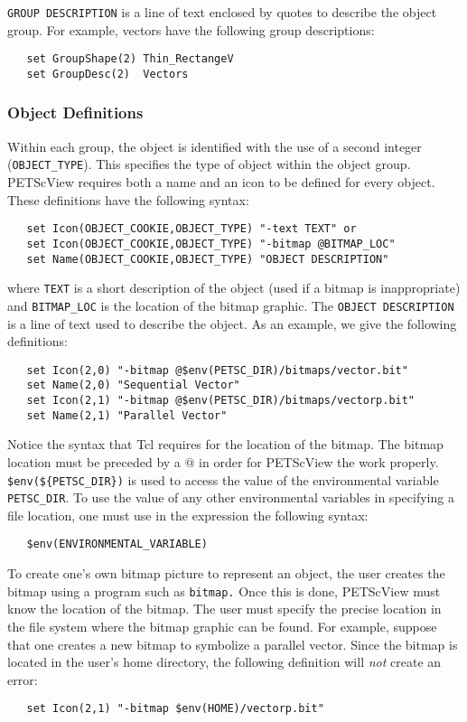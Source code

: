 {\tt GROUP DESCRIPTION} is a line of text enclosed by quotes to describe the object group.  For example, vectors have the following group descriptions:
\begin{verbatim}
   set GroupShape(2) Thin_RectangeV 
   set GroupDesc(2)  Vectors
\end{verbatim}

\subsubsection{Object Definitions}

Within each group, the object is identified with the use of a second integer ({\tt OBJECT\_TYPE}).  This specifies the type of object within the object group.  PETScView requires both a name and an icon to be defined for every object.  These definitions have the following syntax:
\begin{verbatim}
   set Icon(OBJECT_COOKIE,OBJECT_TYPE) "-text TEXT" or 
   set Icon(OBJECT_COOKIE,OBJECT_TYPE) "-bitmap @BITMAP_LOC"
   set Name(OBJECT_COOKIE,OBJECT_TYPE) "OBJECT DESCRIPTION"
\end{verbatim}
where {\tt TEXT} is a short description of the object (used if a bitmap is inappropriate) and {\tt BITMAP\_LOC} is the location of the bitmap graphic.  The {\tt OBJECT DESCRIPTION} is a line of text used to describe the object.  As an example, we give the following definitions:
\begin{verbatim}
   set Icon(2,0) "-bitmap @$env(PETSC_DIR)/bitmaps/vector.bit" 
   set Name(2,0) "Sequential Vector" 
   set Icon(2,1) "-bitmap @$env(PETSC_DIR)/bitmaps/vectorp.bit" 
   set Name(2,1) "Parallel Vector"
\end{verbatim}
Notice the syntax that Tcl requires for the location of the bitmap.
The bitmap location must be preceded by a $@$ in order for PETScView
the work properly.  {\tt \$env(\$\{PETSC\_DIR\})} is used to access the
value of the environmental variable {\tt PETSC\_DIR}.  To use the
value of any other environmental variables in specifying a file
location, one must use in the expression the following syntax:
\begin{verbatim}
   $env(ENVIRONMENTAL_VARIABLE)
\end{verbatim}

To create one's own bitmap picture to represent an
object, the user creates the bitmap using a program such as {\tt bitmap.}
Once this is done, PETScView must know the location of the
bitmap.  The user must specify the precise location in
the file system where the bitmap graphic can be found.  For example,
suppose that one creates a new bitmap to symbolize a parallel vector.
Since the bitmap is located in the user's home directory, the
following definition will {\em not} create an error:
\begin{verbatim}
   set Icon(2,1) "-bitmap $env(HOME)/vectorp.bit"
\end{verbatim}

